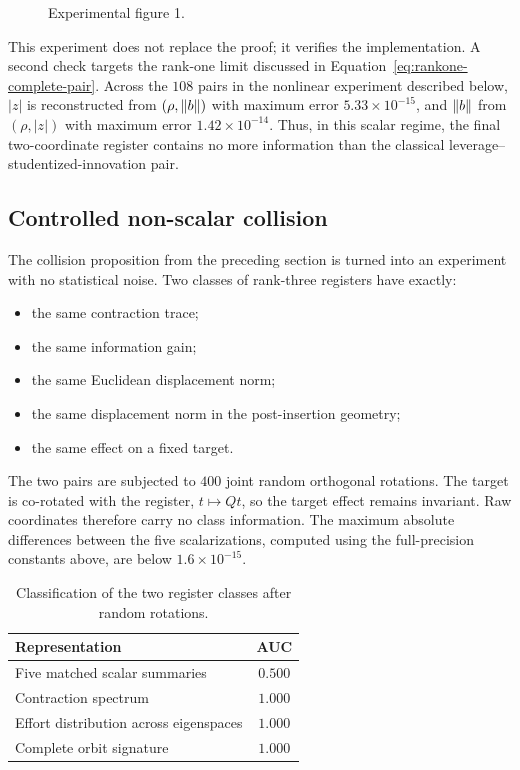 \begin{figure}[htbp]
\centering{}
\caption{Experimental figure 1.}\label{fig:factorization-exact}
\end{figure}

This experiment does not replace the proof; it verifies the implementation. A second check targets the rank-one limit discussed in Equation~\eqref{eq:rankone-complete-pair}. Across the $108$ pairs in the nonlinear experiment described below, $|z|$ is reconstructed from $(\rho,\left\lVert b\right\rVert)$ with maximum error $5.33\times10^{-15}$, and $\left\lVert b\right\rVert$ from $(\rho,|z|)$ with maximum error $1.42\times10^{-14}$. Thus, in this scalar regime, the final two-coordinate register contains no more information than the classical leverage--studentized-innovation pair.

\subsection{Controlled non-scalar collision}
\label{subsec:experiments-nonscalar}
The collision proposition from the preceding section is turned into an experiment with no statistical noise. Two classes of rank-three registers have exactly:
\begin{itemize}
  \item the same contraction trace;
  \item the same information gain;
  \item the same Euclidean displacement norm;
  \item the same displacement norm in the post-insertion geometry;
  \item the same effect on a fixed target.
\end{itemize}
The two pairs are subjected to $400$ joint random orthogonal rotations. The target is co-rotated with the register, $t\mapsto Qt$, so the target effect remains invariant. Raw coordinates therefore carry no class information. The maximum absolute differences between the five scalarizations, computed using the full-precision constants above, are below $1.6\times10^{-15}$.

\begin{table}[H]
\centering
\caption{Classification of the two register classes after random rotations.}
\label{tab:nonscalar-collision}
\small
\begin{tabular}{@{}lc@{}}
\toprule
Representation & AUC \\
\midrule
Five matched scalar summaries & $0.500$ \\
Contraction spectrum & $1.000$ \\
Effort distribution across eigenspaces & $1.000$ \\
Complete orbit signature & $1.000$ \\
\bottomrule
\end{tabular}
\end{table}

